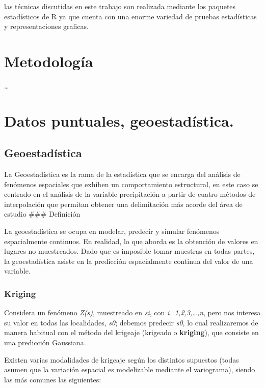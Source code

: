 \documentclass[11pt,]{article}
\begin{document}
las técnicas discutidas en este trabajo son realizada mediante los
paquetes estadísticos de R ya que cuenta con una enorme variedad de
pruebas estadísticas y representaciones graficas.

\section{Metodología}\label{metodologuxeda}

\ldots

\section{Datos puntuales,
geoestadística.}\label{datos-puntuales-geoestaduxedstica.}

\subsection{Geoestadística}\label{geoestaduxedstica}

La Geoestadística es la rama de la estadística que se encarga del
análisis de fenómenos espaciales que exhiben un comportamiento
estructural, en este caso se centrado en el análisis de la variable
precipitación a partir de cuatro métodos de interpolación que permitan
obtener una delimitación más acorde del área de estudio \#\#\#
Definición

La geoestadística se ocupa en modelar, predecir y simular fenómenos
espacialmente continuos. En realidad, lo que aborda es la obtención de
valores en lugares no muestreados. Dado que es imposible tomar muestras
en todas partes, la geoestadística asiste en la predicción espacialmente
continua del valor de una variable.

\subsubsection{Kriging}\label{kriging}

Considera un fenómeno \emph{Z(s)}, muestreado en \emph{si}, con
\emph{i=1,2,3,\ldots{},n}, pero nos interesa su valor en todas las
localidades, \emph{s0}; debemos predecir \emph{s0}, lo cual realizaremos
de manera habitual con el método del krigeaje (krigeado o
\textbf{kriging}), que consiste en una predicción Gaussiana.

Existen varias modalidades de krigeaje según los distintos supuestos
(todas asumen que la variación espacial es modelizable mediante el
variograma), siendo las más comunes las siguientes:
\end{document}
